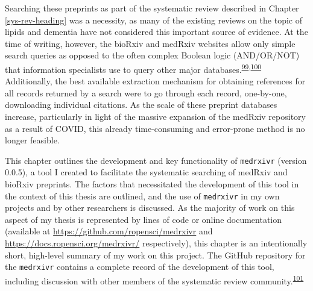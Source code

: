 \documentclass[a4paper, twoside]{templates/ociamthesis}
\begin{document}
Searching these preprints as part of the systematic review described in Chapter \ref{sys-rev-heading} was a necessity, as many of the existing reviews on the topic of lipids and dementia have not considered this important source of evidence. At the time of writing, however, the bioRxiv and medRxiv websites allow only simple search queries as opposed to the often complex Boolean logic (AND/OR/NOT) that information specialists use to query other major databases.\textsuperscript{\protect\hyperlink{ref-bramer2018a}{99},\protect\hyperlink{ref-gusenbauer2020}{100}} Additionally, the best available extraction mechanism for obtaining references for all records returned by a search were to go through each record, one-by-one, downloading individual citations. As the scale of these preprint databases increase, particularly in light of the massive expansion of the medRxiv repository as a result of COVID, this already time-consuming and error-prone method is no longer feasible.

This chapter outlines the development and key functionality of \texttt{medrxivr} (version 0.0.5), a tool I created to facilitate the systematic searching of medRxiv and bioRxiv preprints. The factors that necessitated the development of this tool in the context of this thesis are outlined, and the use of \texttt{medrxivr} in my own projects and by other researchers is discussed. As the majority of work on this aspect of my thesis is represented by lines of code or online documentation (available at \url{https://github.com/ropensci/medrxivr} and \url{https://docs.ropensci.org/medrxivr/} respectively), this chapter is an intentionally short, high-level summary of my work on this project. The GitHub repository for the \texttt{medrxivr} contains a complete record of the development of this tool, including discussion with other members of the systematic review community.\textsuperscript{\protect\hyperlink{ref-zotero-15029}{101}}

~
\end{document}
